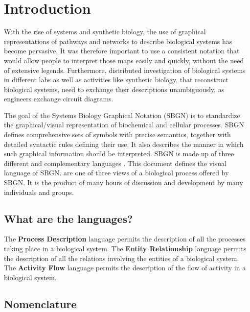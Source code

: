 
\chapter{Introduction}
\label{sec:intro}

With the rise of systems and synthetic biology, the use of graphical
representations of pathways and networks to describe biological
systems has become pervasive. It was therefore important to use a
consistent notation that would allow people to interpret those maps
easily and quickly, without the need of extensive
legends. Furthermore, distributed investigation of biological systems
in different labs as well as activities like synthetic biology, that
reconstruct biological systems, need to exchange their descriptions
unambiguously, as engineers exchange circuit diagrams.

The goal of the Systems Biology Graphical Notation (SBGN) is to
standardize the graphical/visual representation of biochemical and
cellular processes. SBGN defines comprehensive sets of symbols with
precise semantics, together with detailed syntactic rules defining
their use. It also describes the manner in which such graphical
information should be interpreted. SBGN is made up of three different
and complementary languages \cite{LeNovere:NatBiotechnol:2009}. This document
defines the \emph{\AF} visual language of SBGN. \AFs are one of three
views of a biological process offered by SBGN. It is the product of
many hours of discussion and development by many individuals and
groups.
 
\section{What are the languages?}

The \textbf{Process Description} language permits the description of all the processes taking place in a biological system. The \textbf{Entity Relationship} language permits the description of all the relations involving the entities of a biological system. The \textbf{Activity Flow} language permits the description of the flow of activity in a biological system.

\section{Nomenclature}

